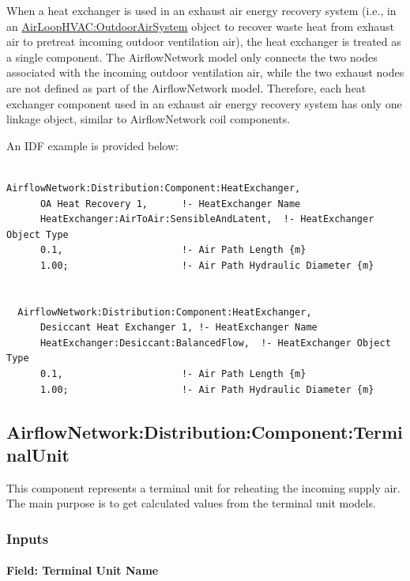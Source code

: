 When a heat exchanger is used in an exhaust air energy recovery system (i.e., in an \hyperref[airloophvacoutdoorairsystem]{AirLoopHVAC:OutdoorAirSystem} object to recover waste heat from exhaust air to pretreat incoming outdoor ventilation air), the heat exchanger is treated as a single component. The AirflowNetwork model only connects the two nodes associated with the incoming outdoor ventilation air, while the two exhaust nodes are not defined as part of the AirflowNetwork model. Therefore, each heat exchanger component used in an exhaust air energy recovery system has only one linkage object, similar to AirflowNetwork coil components.

An IDF example is provided below:

\begin{lstlisting}

AirflowNetwork:Distribution:Component:HeatExchanger,
      OA Heat Recovery 1,      !- HeatExchanger Name
      HeatExchanger:AirToAir:SensibleAndLatent,  !- HeatExchanger Object Type
      0.1,                     !- Air Path Length {m}
      1.00;                    !- Air Path Hydraulic Diameter {m}


  AirflowNetwork:Distribution:Component:HeatExchanger,
      Desiccant Heat Exchanger 1, !- HeatExchanger Name
      HeatExchanger:Desiccant:BalancedFlow,  !- HeatExchanger Object Type
      0.1,                     !- Air Path Length {m}
      1.00;                    !- Air Path Hydraulic Diameter {m}
\end{lstlisting}

\subsection{AirflowNetwork:Distribution:Component:TerminalUnit}\label{airflownetworkdistributioncomponentterminalunit}

This component represents a terminal unit for reheating the incoming supply air. The main purpose is to get calculated values from the terminal unit models.

\subsubsection{Inputs}\label{inputs-19}

\paragraph{Field: Terminal Unit Name}\label{field-terminal-unit-name}

